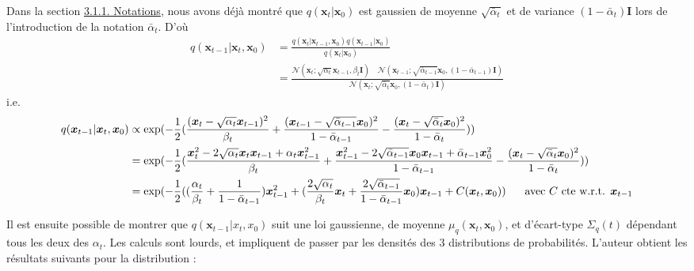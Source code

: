 \documentclass{article}
\begin{document}
Dans la section \hyperref[sec:DDPM_Notations]{3.1.1. Notations}, nous avons déjà montré que $q(\boldsymbol{x}_{t}|\boldsymbol{x}_{0})$ est gaussien de moyenne $\sqrt{\bar \alpha_t}$ et de variance $(1-\bar\alpha_t)\textbf{I}$ lors de l'introduction de la notation $\bar \alpha_t$. D'où
\begin{align*}
q(\boldsymbol{x}_{t-1}|\boldsymbol{x}_{t},\boldsymbol{x}_{0}) &= \frac{q(\boldsymbol{x}_{t}|\boldsymbol{x}_{t-1},\boldsymbol{x}_{0})q(\boldsymbol{x}_{t-1}|\boldsymbol{x}_{0})}{q(\boldsymbol{x}_{t}|\boldsymbol{x}_{0})} \\
&= \frac{\mathcal{N}(\boldsymbol{x}_{t};\sqrt{\alpha_t}\boldsymbol{x}_{t-1},\beta_t \textbf{I}) \quad \mathcal{N}(\boldsymbol{x}_{t-1};\sqrt{\bar\alpha_{t-1}}\boldsymbol{x}_0,(1-\bar\alpha_{t-1})\textbf{I})}{\mathcal{N}(\boldsymbol{x}_t;\sqrt{\bar\alpha_t}\boldsymbol{x}_0,(1-\bar\alpha_t)\textbf{I})}
\end{align*}
i.e.
\begin{align*}
q(\boldsymbol{x}_{t-1}|\boldsymbol{x}_t,\boldsymbol{x}_{0}) &\propto \exp(-\frac{1}{2}( \frac{(\boldsymbol{x}_{t} - \sqrt{\alpha_t}\boldsymbol{x}_{t-1})^2}{\beta_t} + \frac{(\boldsymbol{x}_{t-1} - \sqrt{\bar \alpha_{t-1}}\boldsymbol{x}_0)^2}{1 - \bar \alpha_{t-1}} - \frac{(\boldsymbol{x}_t - \sqrt{\bar \alpha_t}\boldsymbol{x}_0)^2}{1 - \bar \alpha_t}) ) \\
&= \exp(-\frac{1}{2}( \frac{\boldsymbol{x}_{t}^2 - 2\sqrt{\alpha_t}\boldsymbol{x}_{t}\boldsymbol{x}_{t-1} + \alpha_t \boldsymbol{x}_{t-1}^2}{\beta_t} + \frac{\boldsymbol{x}_{t-1}^2 - 2\sqrt{\bar \alpha_{t-1}}\boldsymbol{x}_0\boldsymbol{x}_{t-1} + \bar \alpha_{t-1}\boldsymbol{x}_0^2 }{1 - \bar \alpha_{t-1}} - \frac{(\boldsymbol{x}_t - \sqrt{\bar \alpha_t}\boldsymbol{x}_0)^2}{1 - \bar \alpha_t}) ) \\
&= \exp(-\frac{1}{2}( (\frac{\alpha_t}{\beta_t} + \frac{1}{1 - \bar \alpha_{t-1}})\boldsymbol{x}_{t-1}^2 + (\frac{2\sqrt{\alpha_t}}{\beta_t}\boldsymbol{x}_t + \frac{2\sqrt{\bar \alpha_{t-1}}}{1 - \bar \alpha_{t-1}}\boldsymbol{x}_0)\boldsymbol{x}_{t-1} + C(\boldsymbol{x}_t, \boldsymbol{x}_0)) &\text{$\hspace{-2.5cm}$ avec $C$ cte w.r.t. $\boldsymbol{x}_{t-1}$} \\
\end{align*}

Il est ensuite possible de montrer que $q(\textbf{x}_{t-1}|{x}_{t},{x}_{0})$ suit une loi gaussienne, de moyenne $ \mu_{q}(\textbf{x}_t,\textbf{x}_0)$, et d'écart-type  $\Sigma_q(t)$ dépendant tous les deux des $\alpha_t$. Les calculs sont lourds, et impliquent de passer par les densités des 3 distributions de probabilités. L'auteur obtient les résultats suivants pour la distribution :
\end{document}
